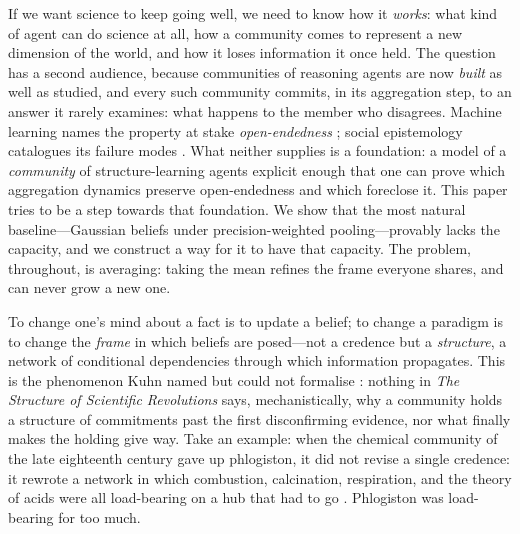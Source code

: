 \documentclass[runningheads]{llncs}
\begin{document}
If we want science to keep going well, we need to know how it \emph{works}: what kind of agent
can do science at all, how a community comes to represent a new dimension of the
world, and how it loses information it once held. The question has a second audience, because
communities of reasoning agents are now \emph{built} as well as studied, and every such
community commits, in its aggregation step, to an answer it rarely examines: what happens to
the member who disagrees. Machine learning names the property at stake \emph{open-endedness}
\citep{stanley2017oe,hughes2024}; social epistemology catalogues its failure modes
\citep{nguyen2018,zollman2010}. What neither supplies is a foundation: a model of a
\emph{community} of structure-learning agents explicit enough that one can prove which
aggregation dynamics preserve open-endedness and which foreclose it. This paper tries to be a
step towards that foundation. We show that the most natural baseline---Gaussian beliefs under
precision-weighted pooling---provably lacks the capacity, and we construct a way for it to
have that capacity. The problem, throughout, is averaging: taking the mean refines the frame
everyone shares, and can never grow a new one.

To change one's mind about a fact is to update a belief; to change a paradigm is to change the
\emph{frame} in which beliefs are posed---not a credence but a \emph{structure}, a network of
conditional dependencies through which information propagates. This is the phenomenon Kuhn
named but could not formalise \citep{kuhn1962}: nothing in \emph{The Structure of Scientific
Revolutions} says, mechanistically, why a community holds a structure of commitments past the
first disconfirming evidence, nor what finally makes the holding give way. Take an example:
when the chemical community of the late eighteenth century gave up phlogiston, it did not
revise a single credence: it rewrote a network in which combustion, calcination, respiration,
and the theory of acids were all load-bearing on a hub that had to go
\citep{blumenthal2017,holmes2000,boantza2011}. Phlogiston was load-bearing for too much.
\end{document}

